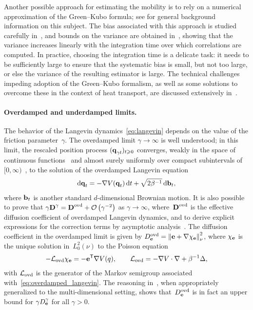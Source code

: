 \documentclass[11pt,a4paper]{article}
\begin{document}
Another possible approach for estimating the mobility is to rely on a numerical approximation of the Green--Kubo formula;
see \cite[Section 5.1.3]{MR3509213} for general background information on this subject.
The bias associated with this approach is studied carefully in~\cite{LMS16},
and bounds on the variance are obtained in~\cite{PSW21},
showing that the variance increases linearly with the integration time over which correlations are computed.
In practice, choosing the integration time is a delicate task:
it needs to be sufficiently large to ensure that the systematic bias is small,
but not too large, or else the variance of the resulting estimator is large.
The technical challenges impeding adoption of the Green--Kubo formalism,
as well as some solutions to overcome these in the context of heat transport,
are discussed extensively in~\cite{ercole2017accurate,Baroni2020}.

\paragraph{Overdamped and underdamped limits.}
The behavior of the Langevin dynamics~\eqref{eq:langevin} depends on the value of the friction parameter~$\gamma$.
The overdamped limit $\gamma \to \infty$ is well understood;
in this limit, the rescaled position process $(\boldsymbol{\mathbf q}_{\gamma t})_{t \geqslant 0}$
converges, weakly in the space of continuous functions~\cite{MR4054345}
and almost surely uniformly over compact subintervals of $[0, \infty)$~\cite[Theorem 10.1]{MR0214150},
to the solution of the overdamped Langevin equation
\begin{equation}
    \label{eq:overdamped_langevin}
    \mathrm d \boldsymbol{\mathbf q}_t = - \nabla V(\boldsymbol{\mathbf q}_t) \, \mathrm d t + \sqrt{2 \beta^{-1}} \, \mathrm d \boldsymbol{\mathbf b}_t,
\end{equation}
where $\boldsymbol{\mathbf b}_t$ is another standard $d$-dimensional Brownian motion.
It is also possible to prove that $\gamma \mat D^{\gamma} = \mat D^{\rm ovd} + \bigo{\gamma^{-2}}$ as $\gamma \to \infty$,
where~$\boldsymbol{\mathbf D}^{\rm ovd}$ is the effective diffusion coefficient of overdamped Langevin dynamics,
and to derive explicit expressions for the correction terms by asymptotic analysis~\cite{MR2394704}.
The diffusion coefficient in the overdamped limit is given by $D^{\rm ovd}_{\vect e} = \norm{\vect e + \grad \chi_{\vect e}}[\nu]^2$,
where $\chi_{\boldsymbol{\mathbf e}}$ is the unique solution in~$L^2_0(\nu)$ to the Poisson equation
\[
    - \mathcal L_{\rm ovd} \chi_{\boldsymbol{\mathbf e}} = - \boldsymbol{\mathbf e}^\mathsf T \nabla V(q), \qquad \mathcal L_{\rm ovd} = - \nabla V \cdot \nabla + \beta^{-1} \Delta,
\]
with $\mathcal L_{\rm ovd}$ is the generator of the Markov semigroup associated with~\eqref{eq:overdamped_langevin}.
The reasoning in~\cite[Proposition 4.1]{MR2394704},
when appropriately generalized to the multi-dimensional setting,
shows that~$D^{\rm ovd}_{\boldsymbol{\mathbf e}}$ is in fact an upper bound for $\gamma D^{\gamma}_{\boldsymbol{\mathbf e}}$ for all $\gamma > 0$.
\end{document}
